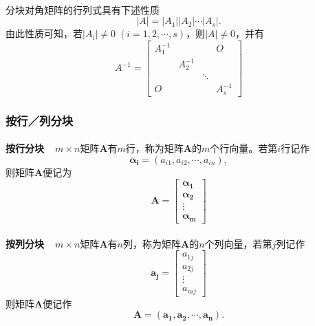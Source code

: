 \paragraph{}
分块对角矩阵的行列式具有下述性质
\begin{equation*}
  |A| = |A_1||A_2|\cdots|A_s|.
\end{equation*}
由此性质可知，若$|A_i|\neq 0 \;(i=1,2,\cdots,s)$，则$|A|\neq 0$，并有
\begin{equation*}
  A^{-1} = \left[\begin{array}{cccc}
    A_1^{-1} & & & O \\
    & A_2^{-1} & & \\
    & & \ddots & \\
    O & & & A_s^{-1}
  \end{array}\right]
\end{equation*}

\subsubsection{按行／列分块}
\paragraph{}
\textbf{按行分块~~}$m\times n$矩阵$\bm{A}$有$m$行，称为矩阵$\bm{A}$的$m$个行向量。若第$i$行记作
\begin{equation*}
  \bm{\alpha_i} = (a_{i1}, a_{i2}, \cdots, a_{in}),
\end{equation*}
则矩阵$\bm{A}$便记为
\begin{equation*}
  \bm{A} = \left[\begin{array}{c}
    \bm{\alpha_1} \\
    \bm{\alpha_2} \\
    \vdots \\
    \bm{\alpha_m}
  \end{array}\right]
\end{equation*}

\paragraph{}
\textbf{按列分块~~}$m\times n$矩阵$\bm{A}$有$n$列，称为矩阵$\bm{A}$的$n$个列向量，若第$j$列记作
\begin{equation*}
  \bm{a_j} = \left[\begin{array}{c}
    a_{1j} \\
    a_{2j} \\
    \vdots \\
    a_{mj}
  \end{array}\right]
\end{equation*}
则矩阵$\bm{A}$便记作
\begin{equation*}
  \bm{A} = (\bm{a_1}, \bm{a_2}, \cdots, \bm{a_n}).
\end{equation*}

